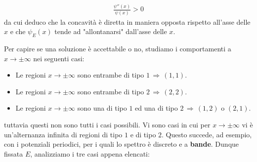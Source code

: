 \begin{enumerate}[label=\arabic*)]
\begin{minipage}{0.5\textwidth}
\end{minipage}
\hfill
\begin{minipage}{0.5\textwidth}

\begin{align*}
	\frac{\psi''(x)}{\psi(x)} > 0
\end{align*}
	da cui deduco che la concavità è diretta in maniera opposta rispetto all'asse delle $x$ e che $\psi_E(x)$ tende ad "allontanarsi" dall'asse delle $x$.
\end{minipage}
\vspace{1em}
	
\end{enumerate}

	Per capire se una soluzione è accettabile o no, studiamo i comportamenti a $x \to \pm \infty$ nei seguenti casi:

\begin{itemize}
	\item Le regioni $x \to \pm \infty$ sono entrambe di tipo $1 \, \Rightarrow \, (1, 1)$.
	\item Le regioni $x \to \pm \infty$ sono entrambe di tipo $2 \, \Rightarrow \, (2, 2)$.
	\item Le regioni $x \to \pm \infty$ sono una di tipo $1$ ed una di tipo $2 \, \Rightarrow \, (1, 2)$ o $(2, 1)$.
\end{itemize}
	
	tuttavia questi non sono tutti i casi possibili. Vi sono casi in cui per $x \to \pm \infty$ vi è un'alternanza infinita di regioni di tipo $1$ e di tipo $2$. Questo succede, ad esempio, con i potenziali periodici, per i quali lo spettro è discreto e a \textbf{bande}. Dunque fissata $E$, analizziamo i tre casi appena elencati:

